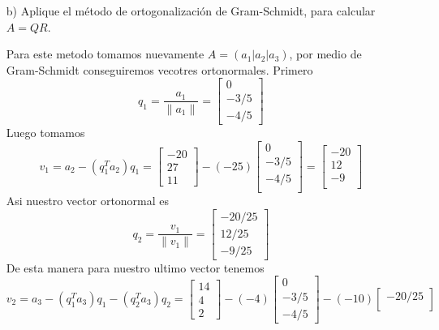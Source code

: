 \begin{enumerate}
\begin{solution}
    \end{solution}
    \item[b)] Aplique el método de ortogonalización de Gram-Schmidt, para calcular $A = QR$.
    \begin{solution}
        Para este metodo tomamos nuevamente $A=(a_1|a_2|a_3)$, por medio de Gram-Schmidt conseguiremos vecotres ortonormales. Primero 
        $$q_1=\frac{a_1}{\|a_1\|}=\begin{bmatrix}
            0\\
            -3/5\\
            -4/5
        \end{bmatrix}$$
        Luego tomamos
        $$v_1=a_2-(q_1^Ta_2)q_1=\begin{bmatrix}
            -20\\
            27\\
            11
        \end{bmatrix}-(-25)\begin{bmatrix}
            0\\
            -3/5\\
            -4/5\\
        \end{bmatrix}=\begin{bmatrix}
            -20\\
            12\\
            -9\\
        \end{bmatrix}$$
        Asi nuestro vector ortonormal es
        $$q_2=\frac{v_1}{\|v_1\|}=\begin{bmatrix}
            -20/25\\
            12/25\\
            -9/25
        \end{bmatrix}$$
        De esta manera para nuestro ultimo vector tenemos 
        $$v_2=a_3-(q_1^Ta_3)q_1-(q_2^Ta_3)q_2=\begin{bmatrix}
            14\\
            4\\
            2
        \end{bmatrix}-(-4)\begin{bmatrix}
            0\\
            -3/5\\
            -4/5
        \end{bmatrix}-(-10)\begin{bmatrix}
            -20/25\\

\end{bmatrix}$$
\end{solution}
\end{enumerate}
